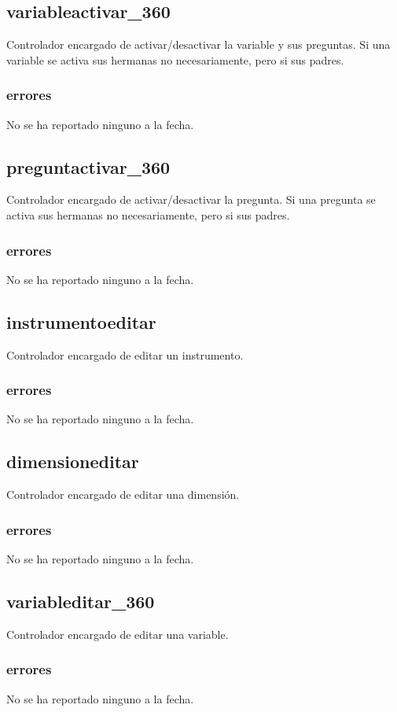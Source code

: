 \documentclass[10pt,a4paper]{book}
\begin{document}
	\subsection{variableactivar\_360}
	Controlador encargado de activar/desactivar la variable y sus preguntas. Si una variable se activa sus hermanas no necesariamente, pero si sus padres.
	\subsubsection{errores}
	No se ha reportado ninguno a la fecha.

	\subsection{preguntactivar\_360}
	Controlador encargado de activar/desactivar la pregunta. Si una pregunta se activa sus hermanas no necesariamente, pero si sus padres.
	\subsubsection{errores}
	No se ha reportado ninguno a la fecha.

	\subsection{instrumentoeditar}
	Controlador encargado de editar un instrumento.
	\subsubsection{errores}
	No se ha reportado ninguno a la fecha.

	\subsection{dimensioneditar}
	Controlador encargado de editar una dimensión.
	\subsubsection{errores}
	No se ha reportado ninguno a la fecha.

	\subsection{variableditar\_360}
	Controlador encargado de editar una variable.
	\subsubsection{errores}
	No se ha reportado ninguno a la fecha.
\end{document}
